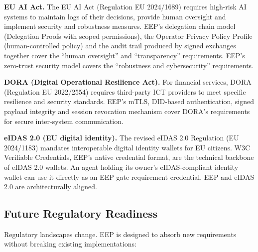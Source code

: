 \documentclass[12pt,a4paper]{article}
\begin{document}
\textbf{EU AI Act.}
The EU AI Act (Regulation EU 2024/1689) \cite{ref16} requires high-risk AI systems to maintain logs of their decisions, provide human oversight and implement security and robustness measures. EEP's delegation chain model (Delegation Proofs with scoped permissions), the Operator Privacy Policy Profile (human-controlled policy) and the audit trail produced by signed exchanges together cover the ``human oversight'' and ``transparency'' requirements. EEP's zero-trust security model covers the ``robustness and cybersecurity'' requirements.

\textbf{DORA (Digital Operational Resilience Act).}
For financial services, DORA (Regulation EU 2022/2554) \cite{ref17} requires third-party ICT providers to meet specific resilience and security standards. EEP's mTLS, DID-based authentication, signed payload integrity and session revocation mechanism cover DORA's requirements for secure inter-system communication.

\textbf{eIDAS 2.0 (EU digital identity).}
The revised eIDAS 2.0 Regulation (EU 2024/1183) \cite{ref15} mandates interoperable digital identity wallets for EU citizens. W3C Verifiable Credentials, EEP's native credential format, are the technical backbone of eIDAS 2.0 wallets. An agent holding its owner's eIDAS-compliant identity wallet can use it directly as an EEP gate requirement credential. EEP and eIDAS 2.0 are architecturally aligned.

\subsection{Future Regulatory Readiness}

Regulatory landscapes change. EEP is designed to absorb new requirements without breaking existing implementations:
\end{document}
